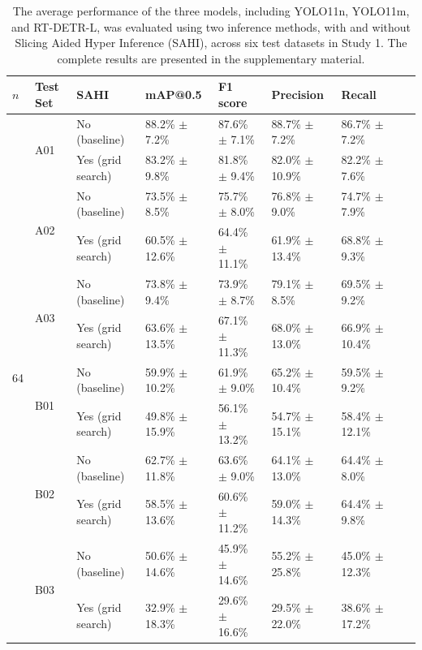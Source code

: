 \begin{table}[H]
    \centering
    \caption{The average performance of the three models, including YOLO11n, YOLO11m, and RT-DETR-L, was evaluated using two inference methods, with and without Slicing Aided Hyper Inference (SAHI), across six test datasets in Study 1. The complete results are presented in the supplementary material.}
    \label{tab:s1_results}
    \small
    \begin{tabular}{lllllllll}
        \toprule
        \textbf{$n$} & \textbf{Test Set} & \textbf{SAHI} & \textbf{mAP@0.5} & \textbf{F1 score} & \textbf{Precision} & \textbf{Recall} \\

        \toprule

            \multirow{12}{*}{64} & \multirow{2}{*}{A01} & No (baseline) & 88.2\% $\pm$ 7.2\% & 87.6\% $\pm$ 7.1\% & 88.7\% $\pm$ 7.2\% & 86.7\% $\pm$ 7.2\% \\
            & & Yes (grid search) & 83.2\% $\pm$ 9.8\% & 81.8\% $\pm$ 9.4\% & 82.0\% $\pm$ 10.9\% & 82.2\% $\pm$ 7.6\% \\
            \cmidrule{2-7}
            & \multirow{2}{*}{A02} & No (baseline) & 73.5\% $\pm$ 8.5\% & 75.7\% $\pm$ 8.0\% & 76.8\% $\pm$ 9.0\% & 74.7\% $\pm$ 7.9\% \\
            & & Yes (grid search) & 60.5\% $\pm$ 12.6\% & 64.4\% $\pm$ 11.1\% & 61.9\% $\pm$ 13.4\% & 68.8\% $\pm$ 9.3\% \\
            \cmidrule{2-7}
            & \multirow{2}{*}{A03} & No (baseline) & 73.8\% $\pm$ 9.4\% & 73.9\% $\pm$ 8.7\% & 79.1\% $\pm$ 8.5\% & 69.5\% $\pm$ 9.2\% \\
            & & Yes (grid search) & 63.6\% $\pm$ 13.5\% & 67.1\% $\pm$ 11.3\% & 68.0\% $\pm$ 13.0\% & 66.9\% $\pm$ 10.4\% \\
            \cmidrule{2-7}
            & \multirow{2}{*}{B01} & No (baseline) & 59.9\% $\pm$ 10.2\% & 61.9\% $\pm$ 9.0\% & 65.2\% $\pm$ 10.4\% & 59.5\% $\pm$ 9.2\% \\
            & & Yes (grid search) & 49.8\% $\pm$ 15.9\% & 56.1\% $\pm$ 13.2\% & 54.7\% $\pm$ 15.1\% & 58.4\% $\pm$ 12.1\% \\
            \cmidrule{2-7}
            & \multirow{2}{*}{B02} & No (baseline) & 62.7\% $\pm$ 11.8\% & 63.6\% $\pm$ 9.0\% & 64.1\% $\pm$ 13.0\% & 64.4\% $\pm$ 8.0\% \\
            & & Yes (grid search) & 58.5\% $\pm$ 13.6\% & 60.6\% $\pm$ 11.2\% & 59.0\% $\pm$ 14.3\% & 64.4\% $\pm$ 9.8\% \\
            \cmidrule{2-7}
            & \multirow{2}{*}{B03} & No (baseline) & 50.6\% $\pm$ 14.6\% & 45.9\% $\pm$ 14.6\% & 55.2\% $\pm$ 25.8\% & 45.0\% $\pm$ 12.3\% \\
            & & Yes (grid search) & 32.9\% $\pm$ 18.3\% & 29.6\% $\pm$ 16.6\% & 29.5\% $\pm$ 22.0\% & 38.6\% $\pm$ 17.2\% \\


\end{tabular}
\end{table}
